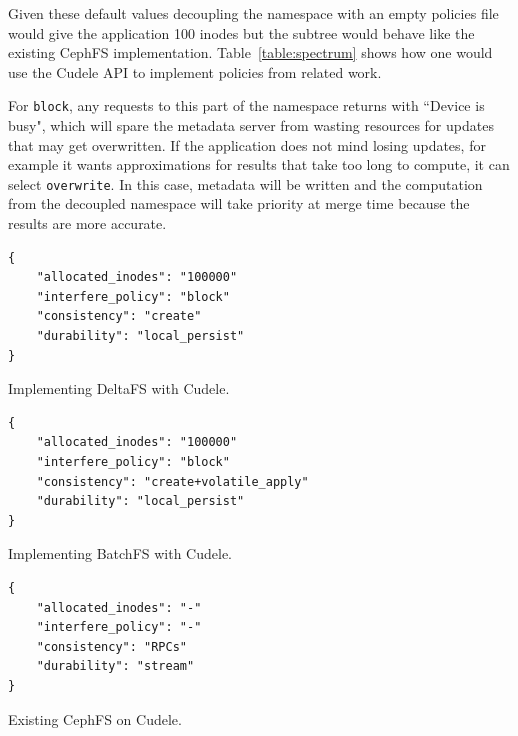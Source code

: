 Given these default values decoupling the namespace with an empty policies file
would give the application 100 inodes but the subtree would behave like the
existing CephFS implementation. Table~\ref{table:spectrum} shows how one would use the Cudele
API to implement policies from related work. 


%

For \texttt{block}, any requests to this part of the namespace returns with
``Device is busy", which will spare the metadata server from wasting resources for updates
that may get overwritten. If the application does not mind losing updates, for
example it wants approximations for results that take too long to compute, it
can select \texttt{overwrite}. In this case, metadata will be written and the
computation from the decoupled namespace will take priority at merge time because the results
are more accurate.

\begin{listing}
\begin{verbatim}
{     
    "allocated_inodes": "100000"
    "interfere_policy": "block"
    "consistency": "create"
    "durability": "local_persist"
}
\end{verbatim}
\caption{Implementing DeltaFS with Cudele.}
\label{src:deltafs}
\end{listing}

\begin{listing}
\begin{verbatim}
{     
    "allocated_inodes": "100000"
    "interfere_policy": "block"
    "consistency": "create+volatile_apply"
    "durability": "local_persist"
}
\end{verbatim}
\caption{Implementing BatchFS with Cudele.}
\label{src:batchfs}
\end{listing}

\begin{listing}
\begin{verbatim}
{     
    "allocated_inodes": "-"
    "interfere_policy": "-"
    "consistency": "RPCs"
    "durability": "stream"
}
\end{verbatim}
\caption{Existing CephFS on Cudele.}
\label{src:batchfs}
\end{listing}

